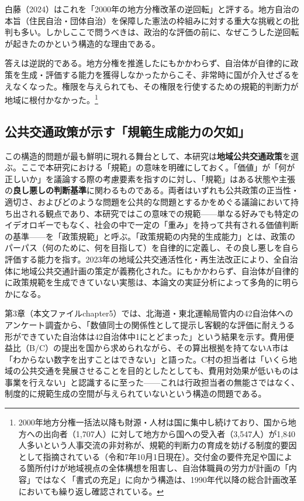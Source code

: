 白藤（2024）はこれを「2000年の地方分権改革の逆回転」と評する\cite{jichiken2024chihojichiho}。地方自治の本旨（住民自治・団体自治）を保障した憲法の枠組みに対する重大な挑戦との批判も多い。しかしここで問うべきは、政治的な評価の前に、なぜこうした逆回転が起きたのかという構造的な理由である。

答えは逆説的である。地方分権を推進したにもかかわらず、自治体が自律的に政策を生成・評価する能力を獲得しなかったからこそ、非常時に国が介入せざるをえなくなった。権限を与えられても、その権限を行使するための規範的判断力が地域に根付かなかった。\footnote{2000年地方分権一括法以降も財源・人材は国に集中し続けており、国から地方への出向者（1,707人）に対して地方から国への受入者（3,547人）が1,840人多いという人事交流の非対称が、規範的判断力の育成を妨げる制度的要因として指摘されている（令和7年10月1日現在）\cite{yaguchi2026}。交付金の要件充足や国による箇所付けが地域視点の全体構想を阻害し、自治体職員の労力が計画の「内容」ではなく「書式の充足」に向かう構造は、1990年代以降の総合計画改革においても繰り返し確認されている\cite{yaguchi2024}。}

\subsection{公共交通政策が示す「規範生成能力の欠如」}
\label{subsec:intro_transport_evidence}

この構造的問題が最も鮮明に現れる舞台として、本研究は\textbf{地域公共交通政策}を選ぶ。ここで本研究における「規範」の意味を明確にしておく。「価値」が「何が正しいか」を議論する際の考慮要素を指すのに対し、「規範」はある状態や主張の\textbf{良し悪しの判断基準}に関わるものである\cite{sano2021_ch1}。両者はいずれも公共政策の正当性・適切さ、およびどのような問題を公共的な問題とするかをめぐる議論において持ち出される観点であり、本研究ではこの意味での規範——単なる好みでも特定のイデオロギーでもなく、社会の中で一定の「重み」を持って共有される価値判断の基準——を「政策規範」と呼ぶ\cite{sano2021_ch1}。「政策規範の内発的生成能力」とは、政策のパーパス（何のために、何を目指して）を自律的に定義し、その良し悪しを自ら評価する能力を指す。2023年の地域公共交通活性化・再生法改正により、全自治体に地域公共交通計画の策定が義務化された。にもかかわらず、自治体が自律的に政策規範を生成できていない実態は、本論文の実証分析によって多角的に明らかになる。

第3章（本文ファイルchapter5）では、北海道・東北運輸局管内の42自治体へのアンケート調査から、「数値同士の関係性として提示し客観的な評価に耐えうる形ができていた自治体は42自治体中1にとどまった」という結果を示す。費用便益比（B/C）の提出を国から求められながら、その算出根拠を持てないA市は「わからない数字を出すことはできない」と語った。C村の担当者は「いくら地域の公共交通を発展させることを目的としたとしても、費用対効果が低いものは事業を行えない」と認識するに至った——これは行政担当者の無能さではなく、制度的に規範生成の空間が与えられていないという構造の問題である。

